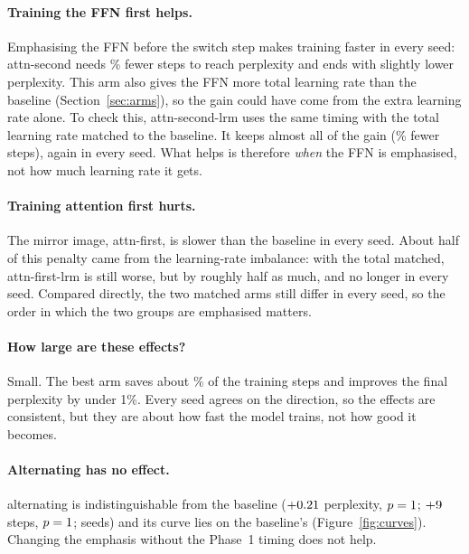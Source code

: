 
\paragraph{Training the FFN first helps.} Emphasising the FFN before the
switch step makes training faster in every seed: attn-second needs
\ASStepsRelAbs\% fewer steps to reach perplexity \TargetPpl{} and ends with
slightly lower perplexity. This arm also gives the FFN more total learning
rate than the baseline (Section~\ref{sec:arms}), so the gain could have come
from the extra learning rate alone. To check this, attn-second-lrm uses
the same timing with the total learning rate matched to the baseline. It
keeps almost all of the gain (\ASLStepsRelAbs\% fewer steps), again in every
seed. What helps is therefore \emph{when} the FFN is emphasised, not how much
learning rate it gets.

\paragraph{Training attention first hurts.} The mirror image, attn-first, is
slower than the baseline in every seed. About half of this penalty came from
the learning-rate imbalance: with the total matched, attn-first-lrm is still
worse, but by roughly half as much, and no longer in every seed. Compared
directly, the two matched arms still differ in every seed, so the order in
which the two groups are emphasised matters.

\paragraph{How large are these effects?} Small. The best arm saves about
\ASLStepsRelAbs\% of the training steps and improves the final perplexity by
under 1\%. Every seed agrees on the direction, so the effects are consistent,
but they are about how fast the model trains, not how good it becomes.

\paragraph{Alternating has no effect.} alternating is indistinguishable from
the baseline ($+0.21$ perplexity, $p = 1$; $+9$ steps,
$p = 1$; \AltSeeds{} seeds) and its curve lies on the baseline's
(Figure~\ref{fig:curves}). Changing the emphasis without the Phase~1 timing
does not help.

